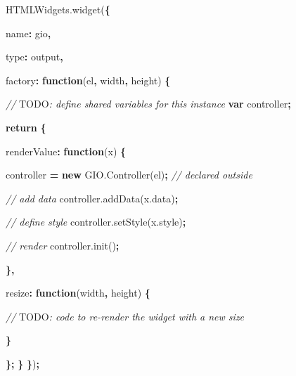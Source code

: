 \documentclass[
]{krantz}
\makeatletter
\newenvironment{Shaded}{\begin{snugshade}}{\end{snugshade}}
\newcommand{\AlertTok}[1]{\textcolor[rgb]{0.33,0.33,0.33}{#1}}
\newcommand{\AttributeTok}[1]{\textcolor[rgb]{0.61,0.61,0.61}{#1}}
\newcommand{\CommentTok}[1]{\textcolor[rgb]{0.37,0.37,0.37}{\textit{#1}}}
\newcommand{\ControlFlowTok}[1]{\textcolor[rgb]{0.27,0.27,0.27}{\textbf{#1}}}
\newcommand{\DataTypeTok}[1]{\textcolor[rgb]{0.27,0.27,0.27}{#1}}
\newcommand{\KeywordTok}[1]{\textcolor[rgb]{0.27,0.27,0.27}{\textbf{#1}}}
\newcommand{\NormalTok}[1]{#1}
\newcommand{\OperatorTok}[1]{\textcolor[rgb]{0.43,0.43,0.43}{\textbf{#1}}}
\newcommand{\StringTok}[1]{\textcolor[rgb]{0.5,0.5,0.5}{#1}}
\newcommand{\VariableTok}[1]{\textcolor[rgb]{0,0,0}{#1}}
\newenvironment{kframe}{%
\medskip{}
\setlength{\fboxsep}{.8em}
 \def\at@end@of@kframe{}%
 \ifinner\ifhmode%
  \def\at@end@of@kframe{\end{minipage}}%
  \begin{minipage}{\columnwidth}%
 \fi\fi%
 \def\FrameCommand##1{\hskip\@totalleftmargin \hskip-\fboxsep
 \colorbox{shadecolor}{##1}\hskip-\fboxsep
     \hskip-\linewidth \hskip-\@totalleftmargin \hskip\columnwidth}%
 \MakeFramed {\advance\hsize-\width
   \@totalleftmargin\z@ \linewidth\hsize
   \@setminipage}}%
 {\par\unskip\endMakeFramed%
 \at@end@of@kframe}
\renewenvironment{Shaded}{\begin{kframe}}{\end{kframe}}
\makeatother
\begin{document}
\begin{Shaded}
\begin{Highlighting}[]
\VariableTok{HTMLWidgets}\NormalTok{.}\AttributeTok{widget}\NormalTok{(}\OperatorTok{\{}

  \DataTypeTok{name}\OperatorTok{:} \StringTok{\textquotesingle{}gio\textquotesingle{}}\OperatorTok{,}

  \DataTypeTok{type}\OperatorTok{:} \StringTok{\textquotesingle{}output\textquotesingle{}}\OperatorTok{,}

  \DataTypeTok{factory}\OperatorTok{:} \KeywordTok{function}\NormalTok{(el}\OperatorTok{,}\NormalTok{ width}\OperatorTok{,}\NormalTok{ height) }\OperatorTok{\{}

    \CommentTok{// }\AlertTok{TODO}\CommentTok{: define shared variables for this instance}
    \KeywordTok{var}\NormalTok{ controller}\OperatorTok{;}

    \ControlFlowTok{return} \OperatorTok{\{}

      \DataTypeTok{renderValue}\OperatorTok{:} \KeywordTok{function}\NormalTok{(x) }\OperatorTok{\{}

\NormalTok{        controller }\OperatorTok{=} \KeywordTok{new} \VariableTok{GIO}\NormalTok{.}\AttributeTok{Controller}\NormalTok{(el)}\OperatorTok{;} \CommentTok{// declared outside}
        
        \CommentTok{// add data}
        \VariableTok{controller}\NormalTok{.}\AttributeTok{addData}\NormalTok{(}\VariableTok{x}\NormalTok{.}\AttributeTok{data}\NormalTok{)}\OperatorTok{;}

        \CommentTok{// define style}
        \VariableTok{controller}\NormalTok{.}\AttributeTok{setStyle}\NormalTok{(}\VariableTok{x}\NormalTok{.}\AttributeTok{style}\NormalTok{)}\OperatorTok{;}

        \CommentTok{// render}
        \VariableTok{controller}\NormalTok{.}\AttributeTok{init}\NormalTok{()}\OperatorTok{;}

      \OperatorTok{\},}

      \DataTypeTok{resize}\OperatorTok{:} \KeywordTok{function}\NormalTok{(width}\OperatorTok{,}\NormalTok{ height) }\OperatorTok{\{}

        \CommentTok{// }\AlertTok{TODO}\CommentTok{: code to re{-}render the widget with a new size}

      \OperatorTok{\}}

    \OperatorTok{\};}
  \OperatorTok{\}}
\OperatorTok{\}}\NormalTok{)}\OperatorTok{;}
\end{Highlighting}
\end{Shaded}
\end{document}
